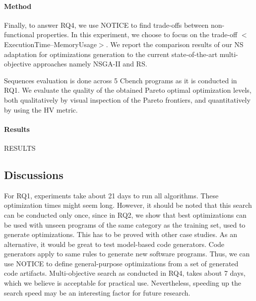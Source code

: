 \paragraph{Method}

Finally, to answer RQ4, we use NOTICE to find trade-offs between non-functional properties. In this experiment, we choose to focus on the trade-off $<$ExecutionTime--MemoryUsage$>$. We report the comparison results of our NS adaptation for optimizations generation to the current state-of-the-art multi-objective approaches namely NSGA-II and RS. 
  
Sequences evaluation is done across 5 Cbench programs as it is conducted in RQ1.
We evaluate the quality of the obtained Pareto optimal optimization levels, both qualitatively by visual inspection of the Pareto frontiers, and quantitatively by using the HV metric.



\paragraph{Results}
RESULTS

\noindent{}
\subsection{Discussions}
For RQ1, experiments take about 21 days to run all algorithms. These optimization times might seem long. However, it should be noted that this search can be conducted only once, since in RQ2, we show that best optimizations can be used with unseen programs of the same category as the training set, used to generate optimizations. This has to be proved with other case studies. As an alternative, it would be great to test model-based code generators. Code generators apply to same rules to generate new software programs. Thus, we can use NOTICE to define general-purpose optimizations from a set of generated code artifacts. 
Multi-objective search as conducted in RQ4, takes about 7 days, which we believe is acceptable for practical use. Nevertheless, speeding up the search speed
may be an interesting factor for future research.




